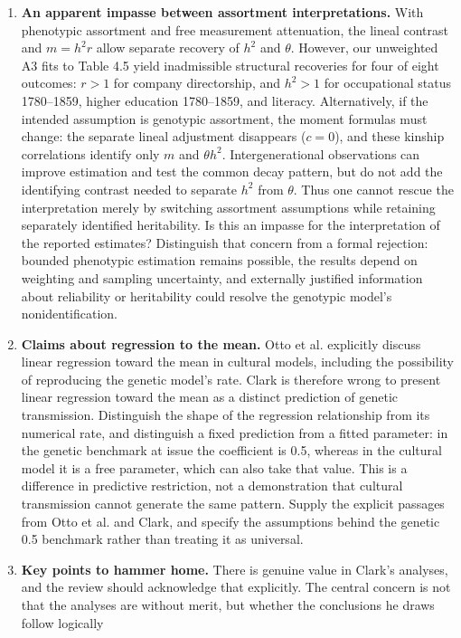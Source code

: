 \documentclass[12pt]{article}
\renewenvironment{itemize}{\begin{enumerate}}{\end{enumerate}}
\begin{document}
\begin{itemize}
correlations inferred in Table 5.2.
\item \textbf{An apparent impasse between assortment interpretations.}
With phenotypic assortment and free measurement attenuation, the lineal
contrast and $m=h^2r$ allow separate recovery of $h^2$ and $\theta$.
However, our unweighted A3 fits to Table 4.5 yield inadmissible structural
recoveries for four of eight outcomes: $r>1$ for company directorship,
and $h^2>1$ for occupational status 1780--1859, higher education
1780--1859, and literacy. Alternatively, if the intended assumption is
genotypic assortment, the moment formulas must change: the separate
lineal adjustment disappears ($c=0$), and these kinship correlations
identify only $m$ and $\theta h^2$. Intergenerational observations can
improve estimation and test the common decay pattern, but do not add
the identifying contrast needed to separate $h^2$ from $\theta$.
Thus one cannot rescue the interpretation merely by switching assortment
assumptions while retaining separately identified heritability. Is this
an impasse for the interpretation of the reported estimates? Distinguish
that concern from a formal rejection: bounded phenotypic estimation
remains possible, the results depend on weighting and sampling uncertainty,
and externally justified information about reliability or heritability
could resolve the genotypic model's nonidentification.
\item \textbf{Claims about regression to the mean.}
Otto et al. explicitly discuss linear regression toward the mean in
cultural models, including the possibility of reproducing the genetic
model's rate. Clark is therefore wrong to present linear regression
toward the mean as a distinct prediction of genetic transmission.
Distinguish the shape of the regression relationship from its numerical
rate, and distinguish a fixed prediction from a fitted parameter: in the
genetic benchmark at issue the coefficient is 0.5, whereas in the cultural
model it is a free parameter, which can also take that value. This is a
difference in predictive restriction, not a demonstration that cultural
transmission cannot generate the same pattern. Supply the explicit
passages from Otto et al. and Clark, and specify the assumptions behind
the genetic 0.5 benchmark rather than treating it as universal.
\item \textbf{Key points to hammer home.}
There is genuine value in Clark's analyses, and the review should
acknowledge that explicitly. The central concern is not that the analyses
are without merit, but whether the conclusions he draws follow logically

\end{itemize}
\end{document}
